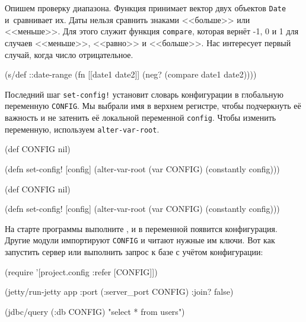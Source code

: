 \fi


Опишем проверку диапазона. Функция принимает вектор двух объектов \verb|Date|
и~сравнивает их. Даты нельзя сравнить знаками <<больше>> или <<меньше>>. Для
этого служит функция \verb|compare|, которая вернёт -1, 0 и 1 для случаев
<<меньше>>, <<равно>> и <<больше>>. Нас интересует первый случай, когда число
отрицательное.

\begin{english}
  \begin{clojure}
(s/def ::date-range
  (fn [[date1 date2]]
    (neg? (compare date1 date2))))
  \end{clojure}
\end{english}

Последний шаг \verb|set-config!| установит словарь конфигурации в глобальную
переменную \verb|CONFIG|. Мы выбрали имя в верхнем регистре, чтобы подчеркнуть
её важность и не затенить её локальной переменной \verb|config|. Чтобы изменить
переменную, используем \verb|alter-var-root|.


\ifnarrow

\begin{english}
  \begin{clojure}
(def CONFIG nil)

(defn set-config!
  [config]
  (alter-var-root (var CONFIG)
    (constantly config)))
  \end{clojure}
\end{english}

\else

\begin{english}
  \begin{clojure}
(def CONFIG nil)

(defn set-config!
  [config]
  (alter-var-root (var CONFIG) (constantly config)))
  \end{clojure}
\end{english}

\fi

На старте программы выполните , и в переменной появится
конфигурация. Другие модули импортируют \verb|CONFIG| и читают нужные им
ключи. Вот как запустить сервер или выполнить запрос к базе с учётом
конфигурации:


\ifnarrow

\begin{english}
  \begin{clojure}
(require
  '[project.config :refer [CONFIG]])

(jetty/run-jetty app
  {:port (:server_port CONFIG)
   :join? false})

(jdbc/query (:db CONFIG)
  "select * from users")
  \end{clojure}
\end{english}

